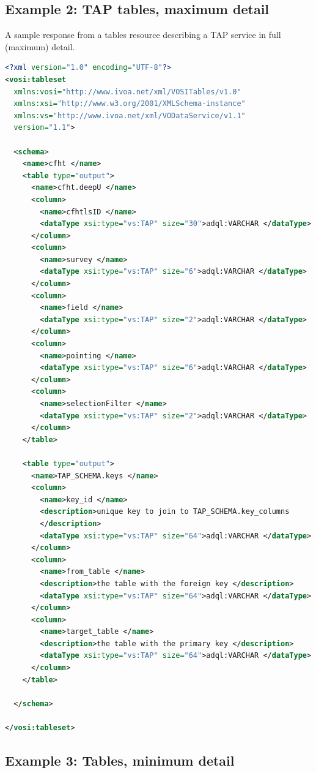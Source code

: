 \documentclass[11pt,letter]{ivoa}
\begin{document}
\subsection{Example 2: TAP tables, maximum detail}

A sample response from a tables resource describing a TAP service in full (maximum) detail.

\begin{lstlisting}[language=XML]
<?xml version="1.0" encoding="UTF-8"?>
<vosi:tableset
  xmlns:vosi="http://www.ivoa.net/xml/VOSITables/v1.0"
  xmlns:xsi="http://www.w3.org/2001/XMLSchema-instance"
  xmlns:vs="http://www.ivoa.net/xml/VODataService/v1.1"
  version="1.1">

  <schema>
    <name>cfht </name>
    <table type="output">
      <name>cfht.deepU </name>
      <column>
        <name>cfhtlsID </name>
        <dataType xsi:type="vs:TAP" size="30">adql:VARCHAR </dataType>
      </column>
      <column>
        <name>survey </name>
        <dataType xsi:type="vs:TAP" size="6">adql:VARCHAR </dataType>
      </column>
      <column>
        <name>field </name>
        <dataType xsi:type="vs:TAP" size="2">adql:VARCHAR </dataType>
      </column>
      <column>
        <name>pointing </name>
        <dataType xsi:type="vs:TAP" size="6">adql:VARCHAR </dataType>
      </column>
      <column>
        <name>selectionFilter </name>
        <dataType xsi:type="vs:TAP" size="2">adql:VARCHAR </dataType>
      </column>
    </table>

    <table type="output">
      <name>TAP_SCHEMA.keys </name>
      <column>
        <name>key_id </name>
        <description>unique key to join to TAP_SCHEMA.key_columns 
        </description>
        <dataType xsi:type="vs:TAP" size="64">adql:VARCHAR </dataType>
      </column>
      <column>
        <name>from_table </name>
        <description>the table with the foreign key </description>
        <dataType xsi:type="vs:TAP" size="64">adql:VARCHAR </dataType>
      </column>
      <column>
        <name>target_table </name>
        <description>the table with the primary key </description>
        <dataType xsi:type="vs:TAP" size="64">adql:VARCHAR </dataType>
      </column>
    </table>

  </schema>

</vosi:tableset>
\end{lstlisting}

\subsection{Example 3: Tables, minimum detail}
\end{document}
